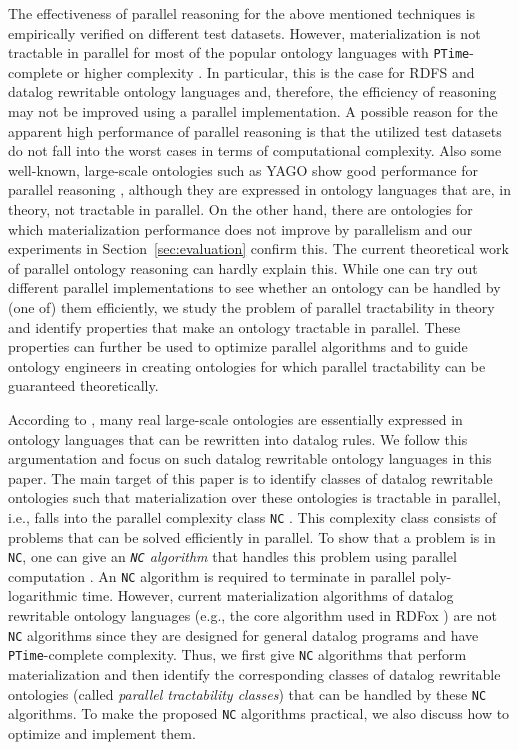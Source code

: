 The effectiveness of parallel reasoning for the above mentioned techniques is empirically verified on different test datasets.
However, materialization is not tractable in parallel for most of the popular ontology languages with \texttt{PTime}-complete or higher complexity \cite{Raymond95}. In particular, this is the case for RDFS and datalog rewritable ontology languages and, therefore, the efficiency of reasoning may not be
improved using a parallel implementation. A possible reason for the apparent high performance of parallel
reasoning is that the utilized test datasets do not fall into the worst cases in terms of computational complexity. Also some well-known, large-scale ontologies such as YAGO show good performance for parallel
reasoning \cite{KolovskiWE10}, although they are expressed in ontology languages that are, in theory, not tractable in parallel.
On the other hand, there are ontologies for which materialization performance does not improve by parallelism and our experiments in Section~\ref{sec:evaluation} confirm this.
The current theoretical work of parallel ontology reasoning can hardly explain this.
While one can try out different parallel implementations to see whether an ontology can be handled by (one of) them efficiently,
we study the problem of parallel tractability in theory and identify properties that make an ontology tractable in parallel.
These properties can further be used to optimize parallel algorithms and to guide ontology engineers in creating ontologies
for which parallel tractability can be guaranteed theoretically.

According to \citet{MotikNPHO14}, many real large-scale ontologies are essentially expressed in ontology languages
that can be rewritten into datalog rules. We follow this argumentation and focus on such datalog rewritable ontology languages in this paper.
The main target of this paper is to identify classes of datalog rewritable ontologies such that materialization
over these ontologies is tractable in parallel, i.e., falls into the parallel complexity class \texttt{NC} \cite{Raymond95}.
This complexity class consists of problems that can be solved efficiently in parallel.
To show that a problem is in \texttt{NC}, one can give an \emph{\texttt{NC} algorithm} that handles this problem
using parallel computation \cite{Raymond95}.
An \texttt{NC} algorithm is required to terminate in parallel poly-logarithmic time.
However, current materialization algorithms of datalog rewritable ontology languages
(e.g., the core algorithm used in RDFox \cite{MotikNPHO14}) are not \texttt{NC} algorithms
since they are designed for general datalog programs and have \texttt{PTime}-complete complexity.
Thus, we first give \texttt{NC} algorithms that perform materialization
and then identify the corresponding classes of datalog rewritable ontologies (called \emph{parallel tractability classes})
that can be handled by these \texttt{NC} algorithms. To make the proposed \texttt{NC} algorithms practical,
we also discuss how to optimize and implement them.

